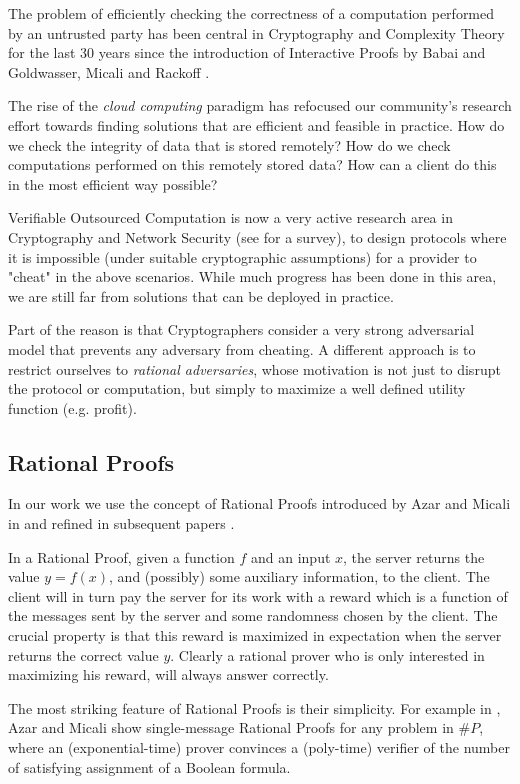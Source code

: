 The problem of efficiently checking the correctness of a computation performed by an untrusted party has been central in Cryptography and Complexity Theory for the last 30 years since the introduction of Interactive Proofs by Babai and Goldwasser, Micali and Rackoff \cite{babai,gmr}. 

The rise of the {\em cloud computing} paradigm has refocused our community's research effort towards finding solutions that are efficient and feasible in practice. How do we check the integrity of data that is stored remotely? How do we check computations performed on this remotely stored data? How can a client do this in the most efficient way possible?

{\sf Verifiable Outsourced Computation} is now a very active research area in Cryptography and Network Security (see \cite{wb15} for a survey), to design protocols where it is impossible (under suitable cryptographic assumptions) for a provider to "cheat" in the above scenarios. While much progress has been done in this area, we are still far from solutions that can be deployed in practice. 

Part of the reason is that Cryptographers consider a very strong adversarial model that prevents {\sf any} adversary from cheating. A different approach is to restrict ourselves to {\em rational adversaries}, whose motivation is not just to disrupt the protocol or computation, but simply to maximize a well defined utility function (e.g. profit).

\subsection{Rational Proofs}

In our work we use the concept of {\sf Rational Proofs} introduced by Azar and Micali in \cite{am} and refined in subsequent papers \cite{am1,ratargs}. 

In a Rational Proof, given a function $f$ and an input $x$, the server returns the value $y=f(x)$, and (possibly) some auxiliary information, to the client. The client will in turn 
pay the server for its work with a reward which is a function of the messages 
sent by the server and some randomness chosen by the client.  The crucial 
property is that this reward is maximized in expectation when the server 
returns the correct value $y$. Clearly a rational prover who is only interested 
in maximizing his reward, will always answer correctly. 

The most striking feature of Rational Proofs is their simplicity. For example in \cite{am}, Azar and Micali show {\sf single-message} Rational Proofs for any problem in $\#P$, where an (exponential-time) prover convinces a (poly-time) verifier of the number of satisfying assignment of a Boolean formula. 


